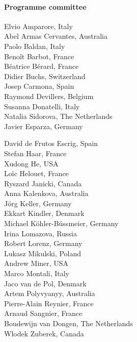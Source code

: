 \documentclass[10pt]{article}
\begin{document}

\paragraph*{Programme committee}\mbox{}
\begin{multicols}{3}
\noindent
Elvio Amparore, Italy \\
Abel Armas Cervantes, Australia \\
Paolo Baldan, Italy \\
Beno\^{i}t Barbot, France \\
B\'{e}atrice B\'{e}rard, France \\
Didier Buchs, Switzerland \\
Josep Carmona, Spain \\
Raymond Devillers, Belgium \\
Susanna Donatelli, Italy \\
Natalia Sidorova, The Netherlands\\
Javier Esparza, Germany

\columnbreak

\noindent
David de Frutos Escrig, Spain \\
Stefan Haar, France \\
Xudong He, USA \\
Lo\"{i}c Helouet, France \\
Ryszard Janicki, Canada \\
Anna Kalenkova, Australia \\
J\"{o}rg Keller, Germany \\
Ekkart Kindler, Denmark \\
Michael K\"{o}hler-B\"{u}ssmeier, Germany \\
Irina Lomazova, Russia\\

\columnbreak
\noindent
Robert Lorenz, Germany \\
Lukasz Mikulski, Poland \\
Andrew Miner, USA \\
Marco Montali, Italy \\
Jaco van de Pol, Denmark\\
Artem Polyvyanyy, Australia\\
Pierre-Alain Reynier, France\\
Arnaud Sangnier, France\\
Boudewijn van Dongen, The Netherlands \\
Wlodek Zuberek, Canada\\

\end{multicols}
\end{document}
